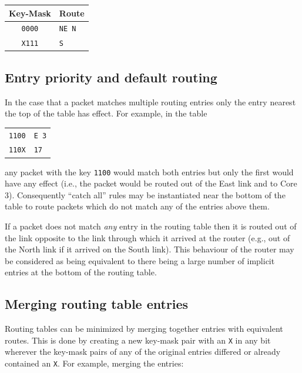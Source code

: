 \documentclass[conference]{IEEEtran}
\newcommand{\mytt}[1]{\texttt{\footnotesize#1}}
\begin{document}
  \begin{table}[H]
    \centering
    \begin{tabular}{c l}
      \toprule
      Key-Mask & Route \\
      \midrule
      \texttt{0000} & \texttt{NE N}\\
      \texttt{X111} & \texttt{S}\\
      \bottomrule
    \end{tabular}
  \end{table}

  \subsection{Entry priority and default routing}

  In the case that a packet matches multiple routing entries only the entry nearest the top of the table has effect.
  For example, in the table

  \begin{table}[H]
    \centering
    \begin{tabular}{c l}
      \toprule
      \texttt{1100} & \texttt{E 3}\\
      \texttt{110X} & \texttt{17}\\
      \bottomrule
    \end{tabular}
  \end{table}

  \noindent any packet with the key \mytt{1100} would match both entries but only the first would have any effect (i.e., the packet would be routed out of the East link and to Core 3).
  Consequently ``catch all'' rules may be instantiated near the bottom of the table to route packets which do not match any of the entries above them.

  If a packet does not match \textit{any} entry in the routing table then it is routed out of the link opposite to the link through which it arrived at the router (e.g., out of the North link if it arrived on the South link).
  This behaviour of the router may be considered as being equivalent to there being a large number of implicit entries at the bottom of the routing table.

  \subsection{Merging routing table entries}

  Routing tables can be minimized by merging together entries with equivalent routes.
  This is done by creating a new key-mask pair with an \mytt{X} in any bit wherever the key-mask pairs of any of the original entries differed or already contained an \mytt{X}.
  For example, merging the entries:
\end{document}
